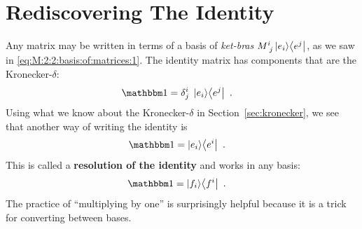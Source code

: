\documentclass[12pt, oneside]{report}    %
\let\oldsection\section
\def\section{%
  \setcounter{sidenote}{1}%
  \oldsection
}
\begin{document}
\section{Rediscovering The Identity}

Any matrix may be written in terms of a basis of \emph{ket-bras} $M\aij{i}{j} \ket{e_i}\!\bra{e^j}$, as we saw in \eqref{eq:M:2:2:basis:of:matrices:1}. The identity matrix has components that are the Kronecker-$\delta$:
\begin{align}
    \one &= \delta^i_j \; \ket{e_i}\!\bra{e^j} \ .
\end{align}
Using what we know about the Kronecker-$\delta$ in Section~\ref{sec:kronecker}, we see that another way of writing the identity is
\begin{align}
    \one &= \ket{e_i}\!\bra{e^i} \ .
    \label{eq:resolution:of:the:identity}
\end{align}
This is called a \textbf{resolution of the identity} and works in any basis:
\begin{align}
    \one &= \ket{f_i}\!\bra{f^i} \ .
\end{align}
The practice of ``multiplying by one'' is surprisingly helpful because it is a trick for converting between bases.
\end{document}
